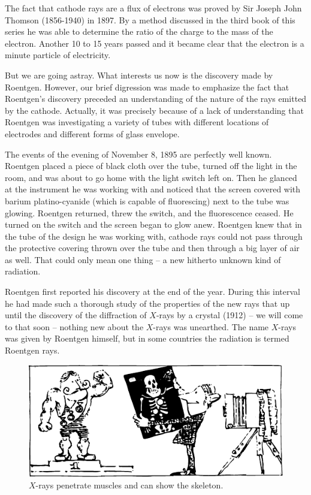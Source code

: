 The fact that cathode rays are a flux of electrons was proved by Sir Joseph John Thomson (1856-1940) in 1897. By a method discussed in the third book of this series he was able to determine the ratio of the charge to the mass of the electron. Another 10 to 15 years passed and it became clear that the electron is a minute particle of electricity.

But we are going astray. What interests us now is the discovery made by Roentgen. However, our brief digres­sion was made to emphasize the fact that Roentgen's discovery preceded an understanding of the nature of the rays emitted by the cathode. Actually, it was precisely because of a lack of understanding that Roentgen was investigating a variety of tubes with different locations of electrodes and different forms of glass envelope.

The events of the evening of November 8, 1895 are perfectly well known. Roentgen placed a piece of black cloth over the tube, turned off the light in the room, and was about to go home with the light switch left on. Then he glanced at the instrument he was working with and noticed that the screen covered with barium platino-cyanide (which is capable of fluorescing) next to the tube was glowing. Roentgen returned, threw the switch, and the fluorescence ceased. He turned on the switch and the screen began to glow anew. Roentgen knew that in the tube of the design he was working with, cathode rays could not pass through the protective covering thrown over the tube and then through a big layer of air as well. That could only mean one thing -- a new hitherto unknown kind of radiation.

Roentgen first reported his discovery at the end of the year. During this interval he had made such a thorough study of the properties of the new rays that up until the discovery of the diffraction of $X$-rays by a crys­tal (1912) -- we will come to that soon -- nothing new about the $X$-rays was unearthed. The name $X$-rays was given by Roentgen himself, but in some countries the radia­tion is termed Roentgen rays.

\begin{figure}[!ht]
\centering
\includegraphics[width=\textwidth]{figures/fig-03-01.pdf}
\caption{$X$-rays penetrate muscles and can show the skeleton.}
\label{fig-3.1}
\end{figure}


